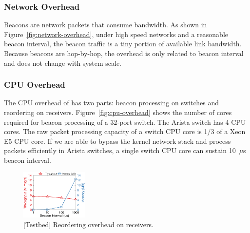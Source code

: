 

\subsubsection{Network Overhead}
\label{sec:eval-overhead}



Beacons are network packets that consume bandwidth.
As shown in Figure~\ref{fig:network-overhead}, under high speed networks and a reasonable beacon interval, the beacon traffic is a tiny portion of available link bandwidth.
Because beacons are hop-by-hop, the overhead is only related to beacon interval and does not change with system scale.

\subsubsection{CPU Overhead}
\label{sec:eval-cpu-overhead}

The CPU overhead of \sys has two parts: beacon processing on switches and reordering on receivers.
Figure~\ref{fig:cpu-overhead} shows the number of cores required for beacon processing of a 32-port switch.
The Arista switch has 4 CPU cores.
The raw packet processing capacity of a switch CPU core is 1/3 of a Xeon E5 CPU core.
If we are able to bypass the kernel network stack and process packets efficiently in Arista switches, a single switch CPU core can sustain 10~$\mu$s beacon interval.


\begin{figure}[t]
\centering
\includegraphics[width=0.3\textwidth]{gnuplot/reorder_receiver.eps}
\caption{[Testbed] Reordering overhead on receivers.}
\label{fig:reorder-overhead}
\end{figure}

